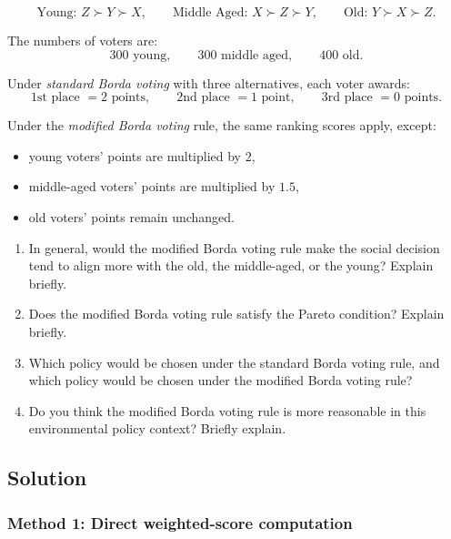 \documentclass[12pt]{article}
\begin{document}
\[
\text{Young: } Z \succ Y \succ X,
\qquad
\text{Middle Aged: } X \succ Z \succ Y,
\qquad
\text{Old: } Y \succ X \succ Z.
\]

The numbers of voters are:
\[
300 \text{ young}, \qquad 300 \text{ middle aged}, \qquad 400 \text{ old}.
\]

Under \emph{standard Borda voting} with three alternatives, each voter awards:
\[
\text{1st place } = 2 \text{ points}, 
\qquad
\text{2nd place } = 1 \text{ point}, 
\qquad
\text{3rd place } = 0 \text{ points}.
\]

Under the \emph{modified Borda voting} rule, the same ranking scores apply, except:
\begin{itemize}[leftmargin=*]
    \item young voters' points are multiplied by \(2\),
    \item middle-aged voters' points are multiplied by \(1.5\),
    \item old voters' points remain unchanged.
\end{itemize}

\begin{enumerate}[label=(\alph*)]
    \item In general, would the modified Borda voting rule make the social decision tend to align more with the old, the middle-aged, or the young? Explain briefly.
    \item Does the modified Borda voting rule satisfy the Pareto condition? Explain briefly.
    \item Which policy would be chosen under the standard Borda voting rule, and which policy would be chosen under the modified Borda voting rule?
    \item Do you think the modified Borda voting rule is more reasonable in this environmental policy context? Briefly explain.
\end{enumerate}

\newpage

\subsection{Solution}

\subsubsection{Method 1: Direct weighted-score computation}
\end{document}
